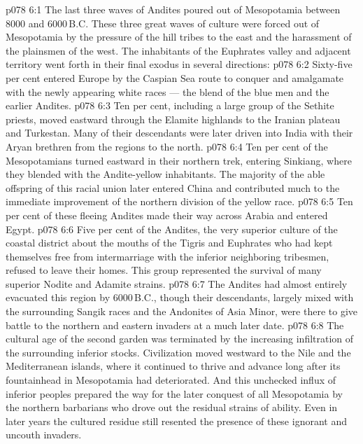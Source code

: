 \vs p078 6:1 The last three waves of Andites poured out of Mesopotamia between 8000 and 6000\,B.C. These three great waves of culture were forced out of Mesopotamia by the pressure of the hill tribes to the east and the harassment of the plainsmen of the west. The inhabitants of the Euphrates valley and adjacent territory went forth in their final exodus in several directions:
\vs p078 6:2 Sixty\hyp{}five per cent entered Europe by the Caspian Sea route to conquer and amalgamate with the newly appearing white races --- the blend of the blue men and the earlier Andites.
\vs p078 6:3 Ten per cent, including a large group of the Sethite priests, moved eastward through the Elamite highlands to the Iranian plateau and Turkestan. Many of their descendants were later driven into India with their Aryan brethren from the regions to the north.
\vs p078 6:4 Ten per cent of the Mesopotamians turned eastward in their northern trek, entering Sinkiang, where they blended with the Andite\hyp{}yellow inhabitants. The majority of the able offspring of this racial union later entered China and contributed much to the immediate improvement of the northern division of the yellow race.
\vs p078 6:5 Ten per cent of these fleeing Andites made their way across Arabia and entered Egypt.
\vs p078 6:6 \pc Five per cent of the Andites, the very superior culture of the coastal district about the mouths of the Tigris and Euphrates who had kept themselves free from intermarriage with the inferior neighboring tribesmen, refused to leave their homes. This group represented the survival of many superior Nodite and Adamite strains.
\vs p078 6:7 \pc The Andites had almost entirely evacuated this region by 6000\,B.C., though their descendants, largely mixed with the surrounding Sangik races and the Andonites of Asia Minor, were there to give battle to the northern and eastern invaders at a much later date.
\vs p078 6:8 The cultural age of the second garden was terminated by the increasing infiltration of the surrounding inferior stocks. Civilization moved westward to the Nile and the Mediterranean islands, where it continued to thrive and advance long after its fountainhead in Mesopotamia had deteriorated. And this unchecked influx of inferior peoples prepared the way for the later conquest of all Mesopotamia by the northern barbarians who drove out the residual strains of ability. Even in later years the cultured residue still resented the presence of these ignorant and uncouth invaders.
